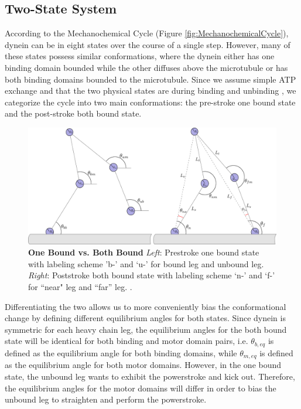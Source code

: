 \subsection{Two-State System}
According to the Mechanochemical Cycle (Figure \ref{fig:MechanochemicalCycle}), dynein can be in eight states over the course of a single step. However, many of these states possess similar conformations, where the dynein either has one binding domain bounded while the other diffuses above the microtubule or has both binding domains bounded to the microtubule. Since we assume simple ATP exchange and that the two physical states are during binding and unbinding \cite{}, we categorize the cycle into two main conformations: the pre-stroke one bound state and the post-stroke both bound state.

\begin{figure}[H]
	\centering
	\includegraphics[width=0.9\columnwidth]{Figures/OB_vs_BB.PNG}
	\caption[One Bound vs. Both Bound]{\textbf{One Bound vs. Both Bound} \textit{Left}: Prestroke one bound state with labeling scheme 'b-’ and ‘u-’ for bound leg and unbound leg. \textit{Right}: Poststroke both bound state with labeling scheme ‘n-’ and ‘f-’ for ``near" leg and ``far'' leg. \cite{Capek2017}.}
	\label{fig:OBvsBB}
\end{figure}

Differentiating the two allows us to more conveniently bias the conformational change by defining different equilibrium angles for both states. Since dynein is symmetric for each heavy chain leg, the equilibrium angles for the both bound state will be identical for both binding and motor domain pairs, i.e. $\theta_{b,eq}$ is defined as the equilibrium angle for both binding domains, while $\theta_{m,eq}$ is defined as the equilibrium angle for both motor domains. However, in the one bound state, the unbound leg wants to exhibit the powerstroke and kick out. Therefore, the equilibrium angles for the motor domains will differ in order to bias the unbound leg to straighten and perform the powerstroke. 


